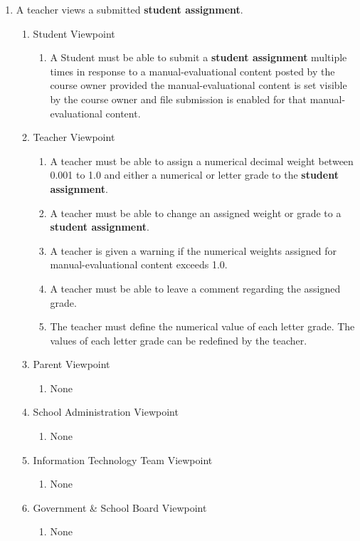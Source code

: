 \documentclass[]{article}
\begin{document}
\begin{enumerate}[{BE}1.]
	\item A teacher views a submitted \textbf{student assignment}.
	\begin{enumerate}[{VP2}.1]
		\item Student Viewpoint
			\begin{enumerate}
				\item A Student must be able to submit a \textbf{student assignment} multiple times in response to a manual-evaluational content posted by the course owner provided the manual-evaluational content is set visible by the course owner and file submission is enabled for that manual-evaluational content.
			\end{enumerate}
		\item Teacher Viewpoint
			\begin{enumerate}
				\item A teacher must be able to assign a numerical decimal weight between 0.001 to 1.0 and either a numerical or letter grade to the \textbf{student assignment}.
				\item A teacher must be able to change an assigned weight or grade to a \textbf{student assignment}.
				\item A teacher is given a warning if the numerical weights assigned for manual-evaluational content exceeds 1.0.
				\item A teacher must be able to leave a comment regarding the assigned grade.
				\item The teacher must define the numerical value of each letter grade. The values of each letter grade can be redefined by the teacher.
			\end{enumerate}
		\item Parent Viewpoint
			\begin{enumerate}
				\item None
			\end{enumerate}
		\item School Administration Viewpoint
			\begin{enumerate}
				\item None
			\end{enumerate}
		\item Information Technology Team Viewpoint
			\begin{enumerate}
				\item None
			\end{enumerate}
		\item Government \& School Board Viewpoint
			\begin{enumerate}
				\item None
			\end{enumerate}
	\end{enumerate}


\end{enumerate}
\end{document}
